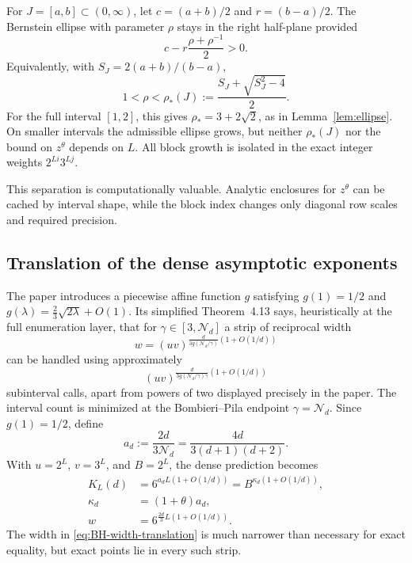 \documentclass[11pt,oneside]{article}
\theoremstyle{definition}
\theoremstyle{remark}
\newcommand{\tht}{\theta}
\newcommand{\Nm}{\mathcal N}
\begin{document}
For $J=[a,b]\subset(0,\infty)$, let $c=(a+b)/2$ and $r=(b-a)/2$.  The Bernstein ellipse with
parameter $\rho$ stays in the right half-plane provided
\[
  c-r\frac{\rho+\rho^{-1}}2>0.
\]
Equivalently, with $S_J=2(a+b)/(b-a)$,
\begin{equation}
  1<\rho<\rho_*(J):=\frac{S_J+\sqrt{S_J^2-4}}2.
  \label{eq:local-rho-star}
\end{equation}
For the full interval $[1,2]$, this gives $\rho_*=3+2\sqrt2$, as in
Lemma~\ref{lem:ellipse}.  On smaller intervals the admissible ellipse grows, but neither
$\rho_*(J)$ nor the bound on $z^\tht$ depends on $L$.  All block growth is isolated in the exact
integer weights $2^{Li}3^{Lj}$.

This separation is computationally valuable.  Analytic enclosures for $z^\tht$ can be cached by
interval shape, while the block index changes only diagonal row scales and required precision.

\subsection{Translation of the dense asymptotic exponents}

The paper introduces a piecewise affine function $g$ satisfying $g(1)=1/2$ and
$g(\lambda)=\frac23\sqrt{2\lambda}+O(1)$.  Its simplified Theorem~4.13 says, heuristically at the
full enumeration layer, that for $\gamma\in[3,\Nm_d]$ a strip of reciprocal width
\[
 w=(uv)^{\frac{d}{3g(\Nm_d/\gamma)}(1+O(1/d))}
\]
can be handled using approximately
\[
 (uv)^{\frac{d}{3g(\Nm_d/\gamma)\gamma}(1+O(1/d))}
\]
subinterval calls, apart from powers of two displayed precisely in the paper.  The interval count
is minimized at the Bombieri--Pila endpoint $\gamma=\Nm_d$.  Since $g(1)=1/2$, define
\begin{equation}
  a_d:=\frac{2d}{3\Nm_d}
      =\frac{4d}{3(d+1)(d+2)}.
  \label{eq:ad}
\end{equation}
With $u=2^L$, $v=3^L$, and $B=2^L$, the dense prediction becomes
\begin{align}
  K_L(d)&=6^{a_dL(1+O(1/d))}
         =B^{\kappa_d(1+O(1/d))},
  \label{eq:BH-call-translation}\\
  \kappa_d&=(1+\tht)a_d,
  \label{eq:kappa-d}\\
  w&=6^{\frac{2d}{3}L(1+O(1/d))}.
  \label{eq:BH-width-translation}
\end{align}
The width in \eqref{eq:BH-width-translation} is much narrower than necessary for exact equality,
but exact points lie in every such strip.
\end{document}
